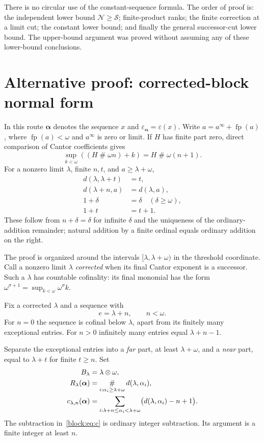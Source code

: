 \documentclass[11pt,a4paper]{article}
\theoremstyle{definition}
\newcommand{\ns}{\mathbin{\#}}
\newcommand{\nprod}{\mathbin{\otimes}}
\newcommand{\bigns}{\mathop{\#}\displaylimits}
\newcommand{\OpN}{\mathcal N}
\newcommand{\OpS}{\mathcal S}
\newcommand{\tail}{\varepsilon}
\newcommand{\seq}[1]{\boldsymbol{#1}}
\newcommand{\fp}{\operatorname{fp}}
\newcommand{\diff}[2]{d(#1,#2)}
\begin{document}
There is no circular use of the constant-sequence formula. The order of
proof is: the independent lower bound $\OpN\ge\OpS$; finite-product ranks;
the finite correction at a limit cut; the constant lower bound; and finally
the general successor-cut lower bound. The upper-bound argument was proved
without assuming any of these lower-bound conclusions.

\section{Alternative proof: corrected-block normal form}\label{block:sec:block}

In this route $\seq\alpha$ denotes the sequence $x$ and
$\varepsilon_{\seq\alpha}=\tail(x)$. Write $a=a^\infty+\fp(a)$,
where $\fp(a)<\omega$ and $a^\infty$ is zero or limit. If $H$ has finite
part zero, direct comparison of Cantor coefficients gives
\begin{equation}\label{block:eq:omega-sup}
\sup_{k<\omega}((H\ns\omega n)+k)=H\ns\omega(n+1).
\end{equation}
For a nonzero limit $\lambda$, finite $n,t$, and $a\ge\lambda+\omega$,
\begin{align}
d(\lambda,\lambda+t)&=t,\label{block:eq:diff-near}\\
d(\lambda+n,a)&=d(\lambda,a),\label{block:eq:diff-far}\\
1+\delta&=\delta\quad(\delta\ge\omega),\label{block:eq:one-plus-infinite}\\
1+t&=t+1.\label{block:eq:one-plus-finite}
\end{align}
These follow from $n+\delta=\delta$ for infinite $\delta$ and the uniqueness
of the ordinary-addition remainder; natural addition by a finite ordinal
equals ordinary addition on the right.


The proof is organized around the intervals $[\lambda,\lambda+\omega)$ in the threshold coordinate. Call a nonzero limit $\lambda$ \emph{corrected} when its final Cantor exponent is a successor. Such a $\lambda$ has countable cofinality: its final monomial has the form $\omega^{\sigma+1}=\sup_{k<\omega}\omega^\sigma k$.

Fix a corrected $\lambda$ and a sequence with
\[
 e=\lambda+n,\qquad n<\omega.
\]
For $n=0$ the sequence is cofinal below $\lambda$, apart from its finitely many exceptional entries. For $n>0$ infinitely many entries equal $\lambda+n-1$.

Separate the exceptional entries into a \emph{far} part, at least $\lambda+\omega$, and a \emph{near} part, equal to $\lambda+t$ for finite $t\ge n$. Set
\begin{align}
 B_\lambda&=\lambda\nprod\omega,\label{block:eq:B}\\
 R_\lambda(\seq\alpha)&=\bigns_{i:\alpha_i\ge\lambda+\omega}
                       \diff\lambda{\alpha_i},\label{block:eq:R}\\
 c_{\lambda,n}(\seq\alpha)&=
  \sum_{i:\lambda+n\le\alpha_i<\lambda+\omega}
          \bigl(\diff\lambda{\alpha_i}-n+1\bigr).\label{block:eq:c}
\end{align}
The subtraction in~\eqref{block:eq:c} is ordinary integer subtraction. Its argument is a finite integer at least $n$.
\end{document}
